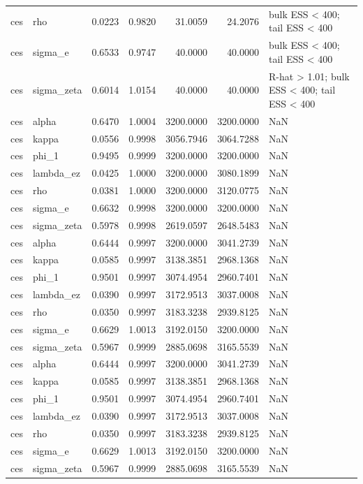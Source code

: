 \begin{tabular}{llrrrrl}
ces & rho & 0.0223 & 0.9820 & 31.0059 & 24.2076 & bulk ESS < 400; tail ESS < 400 \\
ces & sigma\_e & 0.6533 & 0.9747 & 40.0000 & 40.0000 & bulk ESS < 400; tail ESS < 400 \\
ces & sigma\_zeta & 0.6014 & 1.0154 & 40.0000 & 40.0000 & R-hat > 1.01; bulk ESS < 400; tail ESS < 400 \\
ces & alpha & 0.6470 & 1.0004 & 3200.0000 & 3200.0000 & NaN \\
ces & kappa & 0.0556 & 0.9998 & 3056.7946 & 3064.7288 & NaN \\
ces & phi\_1 & 0.9495 & 0.9999 & 3200.0000 & 3200.0000 & NaN \\
ces & lambda\_ez & 0.0425 & 1.0000 & 3200.0000 & 3080.1899 & NaN \\
ces & rho & 0.0381 & 1.0000 & 3200.0000 & 3120.0775 & NaN \\
ces & sigma\_e & 0.6632 & 0.9998 & 3200.0000 & 3200.0000 & NaN \\
ces & sigma\_zeta & 0.5978 & 0.9998 & 2619.0597 & 2648.5483 & NaN \\
ces & alpha & 0.6444 & 0.9997 & 3200.0000 & 3041.2739 & NaN \\
ces & kappa & 0.0585 & 0.9997 & 3138.3851 & 2968.1368 & NaN \\
ces & phi\_1 & 0.9501 & 0.9997 & 3074.4954 & 2960.7401 & NaN \\
ces & lambda\_ez & 0.0390 & 0.9997 & 3172.9513 & 3037.0008 & NaN \\
ces & rho & 0.0350 & 0.9997 & 3183.3238 & 2939.8125 & NaN \\
ces & sigma\_e & 0.6629 & 1.0013 & 3192.0150 & 3200.0000 & NaN \\
ces & sigma\_zeta & 0.5967 & 0.9999 & 2885.0698 & 3165.5539 & NaN \\
ces & alpha & 0.6444 & 0.9997 & 3200.0000 & 3041.2739 & NaN \\
ces & kappa & 0.0585 & 0.9997 & 3138.3851 & 2968.1368 & NaN \\
ces & phi\_1 & 0.9501 & 0.9997 & 3074.4954 & 2960.7401 & NaN \\
ces & lambda\_ez & 0.0390 & 0.9997 & 3172.9513 & 3037.0008 & NaN \\
ces & rho & 0.0350 & 0.9997 & 3183.3238 & 2939.8125 & NaN \\
ces & sigma\_e & 0.6629 & 1.0013 & 3192.0150 & 3200.0000 & NaN \\
ces & sigma\_zeta & 0.5967 & 0.9999 & 2885.0698 & 3165.5539 & NaN \\

\end{tabular}
